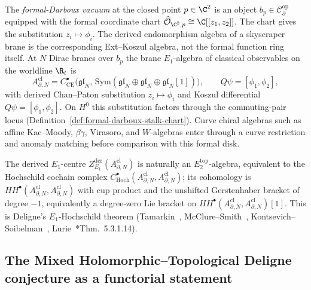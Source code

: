 \begin{constr}\label{app:constr:brane-vacuum-E1}
The \emph{formal-Darboux vacuum} at the closed point $p\in\C^2$ is
an object \(b_p\in\mathcal{C}^{\mathrm{op}}_\partial\) equipped with
the formal coordinate chart
\(\widehat{\mathcal O}_{\C^2,p}\cong\C[[z_1,z_2]]\).  The chart gives
the substitution \(z_i\mapsto\phi_i\).  The derived endomorphism
algebra of a skyscraper brane is the corresponding Ext--Koszul
algebra, not the formal function ring itself.  At $N$ Dirac branes
over $b_p$ the brane $E_1$-algebra of classical observables on the
worldline $\R_t$ is
\[
  A^{\mathrm{cl}}_{\partial,N}
   =C^\bullet_{\mathrm{CE}}\bigl(\mathfrak{gl}_N,\,
       \mathrm{Sym}(\mathfrak{gl}_N\oplus\mathfrak{gl}_N
                    \oplus\mathfrak{gl}_N[1])\bigr),
   \qquad
   Q\psi=[\phi_1,\phi_2],
\]
with derived Chan--Paton substitution \(z_i\mapsto\phi_i\) and
Koszul differential \(Q\psi=[\phi_1,\phi_2]\).  On \(H^0\) this
substitution factors through the commuting-pair locus
(Definition~\ref{def:formal-darboux-stalk-chart}).  Curve chiral
algebras such as affine Kac--Moody, \(\beta\gamma\), Virasoro, and
\(W\)-algebras enter through a curve restriction and anomaly
matching before comparison with this formal disk.
\end{constr}

\begin{prop}\label{app:prop:brane-HH-E2}
The derived $E_1$-centre
$Z^{\mathrm{der}}_{E_1}(A^{\mathrm{cl}}_{\partial,N})$ is naturally an
\(E_2^{\mathrm{top}}\)-algebra, equivalent to the Hochschild cochain complex
$C^\bullet_{\mathrm{Hoch}}(A^{\mathrm{cl}}_{\partial,N},A^{\mathrm{cl}}_{\partial,N})$;
its cohomology is
$HH^\bullet(A^{\mathrm{cl}}_{\partial,N},A^{\mathrm{cl}}_{\partial,N})$
with cup product and the unshifted Gerstenhaber bracket of degree
\(-1\), equivalently a degree-zero Lie bracket on
$HH^\bullet(A^{\mathrm{cl}}_{\partial,N},A^{\mathrm{cl}}_{\partial,N})[1]$.
This is Deligne's
$E_1$-Hochschild theorem
(Tamarkin~\cite{tamarkin-deligne},
McClure--Smith~\cite{mcclure-smith},
Kontsevich--Soibelman~\cite{kontsevich-soibelman-deformation},
Lurie~\cite{lurie-ha}*{Thm.~5.3.1.14}).
\end{prop}

\subsection{The Mixed Holomorphic--Topological Deligne conjecture as a
functorial statement}\label{app:hfc:mixed-HT-Deligne}

